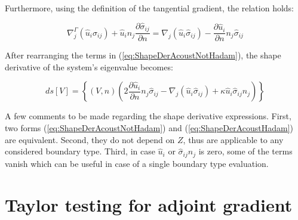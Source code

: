 Furthermore, using the definition of the tangential gradient, the relation holds:

\begin{equation}
\nabla_j^{\Gamma} (\hat{u}_i \hat{\sigma}_{ij}) + \hat{u}_i n_j \frac{\partial \hat{\sigma}_{ij}}{\partial n} = \nabla_j (\hat{u}_i \hat{\sigma}_{ij}) - \frac{\partial \hat{u}_i}{\partial n} n_j \hat{\sigma}_{ij} 
\end{equation}

After rearranging the terms in (\ref{eq:ShapeDerAcoustNotHadam}), the shape derivative of the system's eigenvalue becomes:

\begin{equation}
\label{eq:ShapeDerAcoustHadam}
d s [V] = \left\{ (V,n) \left( 2 \frac{\partial \hat{u}_i}{\partial n} n_j \hat{\sigma}_{ij} - \nabla_j \left( \hat{u}_i \hat{\sigma}_{ij} \right)  + \kappa \hat{u}_i \hat{\sigma}_{ij} n_j \right) \right\}
\end{equation}

A few comments to be made regarding the shape derivative expressions. First, two forms (\ref{eq:ShapeDerAcoustNotHadam}) and (\ref{eq:ShapeDerAcoustHadam}) are equivalent. Second, they do not depend on $Z$, thus are applicable to any considered boundary type. Third, in case $\hat{u}_i$ or $\hat{\sigma}_{ij} n_j$ is zero, some of the terms vanish which can be useful in case of a single boundary type evaluation. 

\section{Taylor testing for adjoint gradient}
